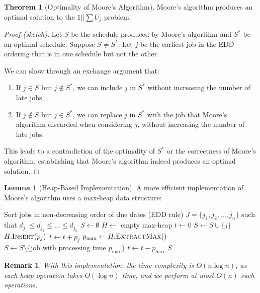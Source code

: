 \documentclass{article}
\newtheorem{remark}{Remark}
\theoremstyle{definition}
\newtheorem{theorem}{Theorem}
\newtheorem{lemma}{Lemma}
\begin{document}
\begin{theorem}[Optimality of Moore's Algorithm]
Moore's algorithm produces an optimal solution to the $1||\sum U_j$ problem.
\begin{proof}[Proof (sketch)]
Let $S$ be the schedule produced by Moore's algorithm and $S^*$ be an optimal schedule. Suppose $S \neq S^*$. Let $j$ be the earliest job in the EDD ordering that is in one schedule but not the other. 

We can show through an exchange argument that:
\begin{enumerate}
    \item If $j \in S$ but $j \notin S^*$, we can include $j$ in $S^*$ without increasing the number of late jobs.
    \item If $j \notin S$ but $j \in S^*$, we can replace $j$ in $S^*$ with the job that Moore's algorithm discarded when considering $j$, without increasing the number of late jobs.
\end{enumerate}

This leads to a contradiction of the optimality of $S^*$ or the correctness of Moore's algorithm, establishing that Moore's algorithm indeed produces an optimal solution.
\end{proof}
\end{theorem}

\begin{lemma}[Heap-Based Implementation]
A more efficient implementation of Moore's algorithm uses a max-heap data structure:

\begin{algorithm}
\caption{Moore's Algorithm with Heap}
\begin{algorithmic}[1]
    \State Sort jobs in non-decreasing order of due dates (EDD rule)
    \State $J = \{j_1, j_2, \ldots, j_n\}$ such that $d_{j_1} \leq d_{j_2} \leq \ldots \leq d_{j_n}$
    \State $S \gets \emptyset$ 
    \State $H \gets$ empty max-heap 
    \State $t \gets 0$ 
        \State $S \gets S \cup \{j\}$ 
        \State $H.\textsc{Insert}(p_j)$ 
        \State $t \gets t + p_j$ 
         
            \State $p_{\max} \gets H.\textsc{ExtractMax}()$ 
            \State $S \gets S \setminus \{\text{job with processing time } p_{\max}\}$
            \State $t \gets t - p_{\max}$ 
        \EndIf
    \EndFor
    \State \Return $S$
\EndProcedure
\end{algorithmic}
\end{algorithm}

\begin{remark}
With this implementation, the time complexity is $O(n \log n)$, as each heap operation takes $O(\log n)$ time, and we perform at most $O(n)$ such operations.
\end{remark}
\end{lemma}
\end{document}
